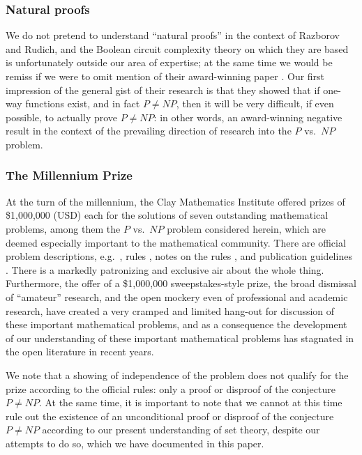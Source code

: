 \documentclass[letterpaper]{article}
\begin{document}
\subsubsection{Natural proofs}
We do not pretend to understand ``natural proofs'' in the context of Razborov and Rudich, and the Boolean circuit complexity theory on which they are based is unfortunately outside our area of expertise; at the same time we would be remiss if we were to omit mention of their award-winning \cite{kehoe2007prize} paper \cite{razborov1997natural}.  Our first impression of the general gist of their research is that they showed that if one-way functions exist, and in fact $P\ne NP$, then it will be very difficult, if even possible, to actually prove $P\ne NP$: in other words, an award-winning negative result in the context of the prevailing direction of research into the $P$ vs.\ $NP$ problem.

\subsubsection{The Millennium Prize}
At the turn of the millennium, the Clay Mathematics Institute \cite{claymath} offered prizes \cite{claymath-millenium-prize} of \$1,000,000 (USD) each for the solutions of seven outstanding mathematical problems, among them the $P$ vs.\ $NP$ problem considered herein, which are deemed especially important to the mathematical community.  There are official problem descriptions, e.g.~\cite{claymath-pnp-problem-description}, rules \cite{claymath-millennium-prize-rules}, notes on the rules \cite{claymath-notes-on-rules}, and publication guidelines \cite{claymath-publication-guidelines}. There is a markedly patronizing and exclusive air about the whole thing.  Furthermore, the offer of a \$1,000,000 sweepstakes-style prize, the broad dismissal of ``amateur'' research, and the open mockery even of professional and academic research, have created a very cramped and limited hang-out for discussion of these important mathematical problems, and as a consequence the development of our understanding of these important mathematical problems has stagnated in the open literature in recent years.

We note that a showing of independence of the problem does not qualify for the prize according to the official rules: only a proof or disproof of the conjecture $P\ne NP$.  At the same time, it is important to note that we cannot at this time rule out the existence of an unconditional proof or disproof of the conjecture $P\ne NP$ according to our present understanding of set theory, despite our attempts to do so, which we have documented in this paper.
\end{document}
